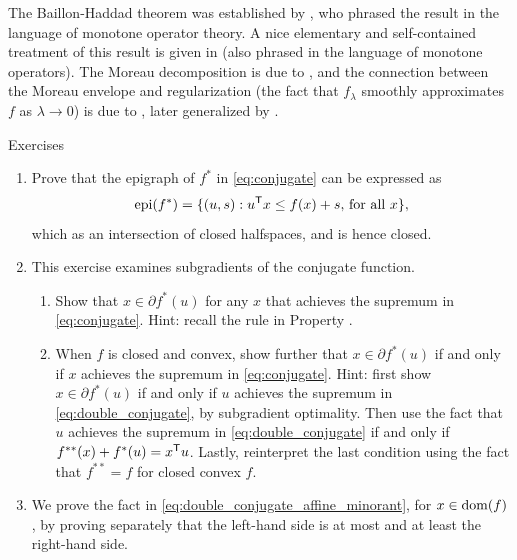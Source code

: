 The Baillon-Haddad theorem was established by \cite{baillon1977quelques},
who phrased the result in the language of monotone operator theory. A nice 
elementary and self-contained treatment of this result is given in
\cite{bauschke2009baillon} (also phrased in the language of monotone
operators). The Moreau decomposition is due to \cite{moreau1962fonctions,
  moreau1965proximite}, and the connection between the Moreau envelope and 
regularization (the fact that $f_\lambda$ smoothly approximates $f$ as $\lambda
\to 0$) is due to \cite{attouch1977convergence}, later generalized by
\cite{attouch1981convergence}.  

\clearpage

\begin{xcb}{Exercises}
\begin{enumerate}[label=\thechapter.\arabic*]
\settowidth{\leftmargini}{0.00.\hskip\labelsep}
\item \label{ex:conjugate_closed}
  Prove that the epigraph of $f^*$ in \eqref{eq:conjugate} can be expressed as  
  \[
  \operatorname{epi}(f^*) = \{ (u,s) : u^{\mathsf{T}} x \leq f(x) + s, \, \text{for all $x$} \},
  \]
  which as an intersection of closed halfspaces, and is hence closed. 

\item \label{ex:conjugate_subgradients}
  This exercise examines subgradients of the conjugate function.

\begin{enumerate}[label=\alph*.]
\item Show that $x \in \partial f^*(u)$ for any $x$ that achieves the supremum
  in \eqref{eq:conjugate}. Hint: recall the rule in Property
  . 

\item When $f$ is closed and convex, show further that $x \in \partial f^*(u)$
  if and only if $x$ achieves the supremum in \eqref{eq:conjugate}. Hint: first
  show $x \in \partial f^*(u)$ if and only if $u$ achieves the supremum in
  \eqref{eq:double_conjugate}, by subgradient optimality. Then use the fact that
  $u$ achieves the supremum in \eqref{eq:double_conjugate} if and only if
  $f^{**}(x) + f^*(u) = x^{\mathsf{T}} u$. Lastly, reinterpret the last condition using
  the fact that $f^{**} = f$ for closed convex $f$. 
\end{enumerate}

\item \label{ex:double_conjugate_affine_minorant}
  We prove the fact in \eqref{eq:double_conjugate_affine_minorant}, for $x \in
  \operatorname{dom}(f)$, by proving separately that the left-hand side is at most and at
  least the right-hand side.     


\end{enumerate}
\end{xcb}
